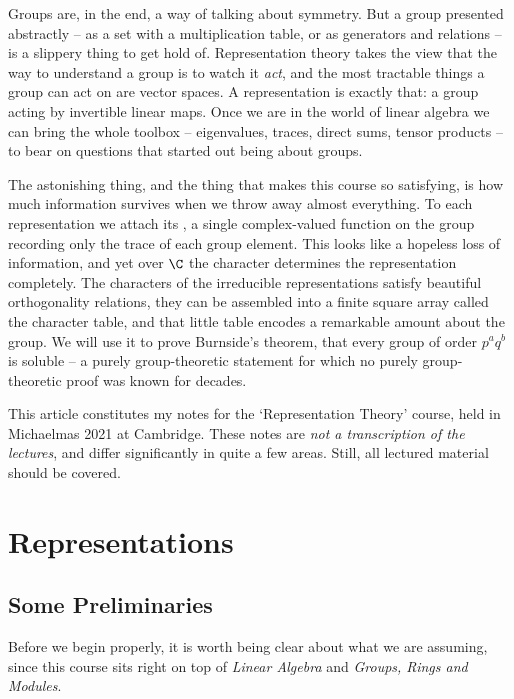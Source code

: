 



Groups are, in the end, a way of talking about symmetry. But a group presented abstractly -- as a set with a multiplication table, or as generators and relations -- is a slippery thing to get hold of. Representation theory takes the view that the way to understand a group is to watch it \emph{act}, and the most tractable things a group can act on are vector spaces. A representation is exactly that: a group acting by invertible linear maps. Once we are in the world of linear algebra we can bring the whole toolbox -- eigenvalues, traces, direct sums, tensor products -- to bear on questions that started out being about groups.

The astonishing thing, and the thing that makes this course so satisfying, is how much information survives when we throw away almost everything. To each representation we attach its , a single complex-valued function on the group recording only the trace of each group element. This looks like a hopeless loss of information, and yet over $\C$ the character determines the representation completely. The characters of the irreducible representations satisfy beautiful orthogonality relations, they can be assembled into a finite square array called the character table, and that little table encodes a remarkable amount about the group. We will use it to prove Burnside's theorem, that every group of order $p^a q^b$ is soluble -- a purely group-theoretic statement for which no purely group-theoretic proof was known for decades.

This article constitutes my notes for the `Representation Theory' course, held in Michaelmas 2021 at Cambridge. These notes are \emph{not a transcription of the lectures}, and differ significantly in quite a few areas. Still, all lectured material should be covered.



\clearpage

\section{Representations}

\subsection{Some Preliminaries}

Before we begin properly, it is worth being clear about what we are assuming, since this course sits right on top of \emph{Linear Algebra} and \emph{Groups, Rings and Modules}.


